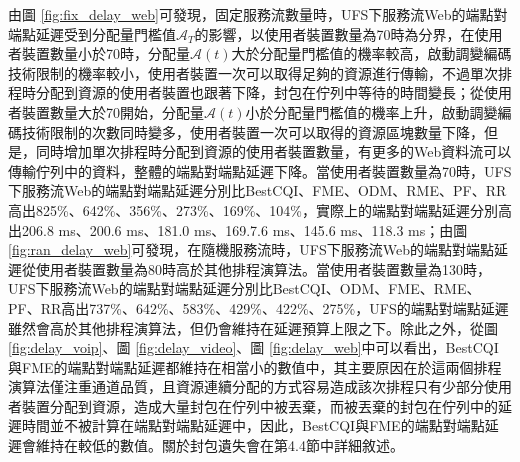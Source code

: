 由圖 \ref{fig:fix_delay_web}可發現，固定服務流數量時，UFS下服務流Web的端點對端點延遲受到分配量門檻值$\mathcal{A}_T$的影響，以使用者裝置數量為70時為分界，在使用者裝置數量小於70時，分配量$\mathcal{A}(t)$大於分配量門檻值的機率較高，啟動調變編碼技術限制的機率較小，使用者裝置一次可以取得足夠的資源進行傳輸，不過單次排程時分配到資源的使用者裝置也跟著下降，封包在佇列中等待的時間變長；從使用者裝置數量大於70開始，分配量$\mathcal{A}(t)$小於分配量門檻值的機率上升，啟動調變編碼技術限制的次數同時變多，使用者裝置一次可以取得的資源區塊數量下降，但是，同時增加單次排程時分配到資源的使用者裝置數量，有更多的Web資料流可以傳輸佇列中的資料，整體的端點對端點延遲下降。當使用者裝置數量為70時，UFS下服務流Web的端點對端點延遲分別比BestCQI、FME、ODM、RME、PF、RR高出825\%、642\%、356\%、273\%、169\%、104\%，實際上的端點對端點延遲分別高出206.8 ms、200.6 ms、181.0 ms、169.7.6 ms、145.6 ms、118.3 ms；由圖 \ref{fig:ran_delay_web}可發現，在隨機服務流時，UFS下服務流Web的端點對端點延遲從使用者裝置數量為80時高於其他排程演算法。當使用者裝置數量為130時，UFS下服務流Web的端點對端點延遲分別比BestCQI、ODM、FME、RME、PF、RR高出737\%、642\%、583\%、429\%、422\%、275\%，UFS的端點對端點延遲雖然會高於其他排程演算法，但仍會維持在延遲預算上限之下。除此之外，從圖 \ref{fig:delay_voip}、圖 \ref{fig:delay_video}、圖 \ref{fig:delay_web}中可以看出，BestCQI與FME的端點對端點延遲都維持在相當小的數值中，其主要原因在於這兩個排程演算法僅注重通道品質，且資源連續分配的方式容易造成該次排程只有少部分使用者裝置分配到資源，造成大量封包在佇列中被丟棄，而被丟棄的封包在佇列中的延遲時間並不被計算在端點對端點延遲中，因此，BestCQI與FME的端點對端點延遲會維持在較低的數值。關於封包遺失會在第4.4節中詳細敘述。
